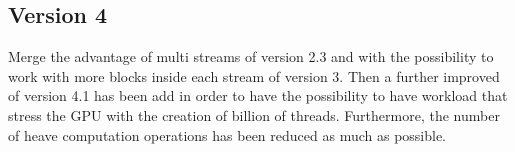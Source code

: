 \subsection{Version 4}

Merge the advantage of multi streams of version 2.3 and with the possibility to work with more blocks inside each stream of
version 3. Then a further improved of version 4.1 has been add in order to have the possibility to have workload that stress
the GPU with the creation of billion of threads.
Furthermore, the number of heave computation operations has been reduced as much as possible.